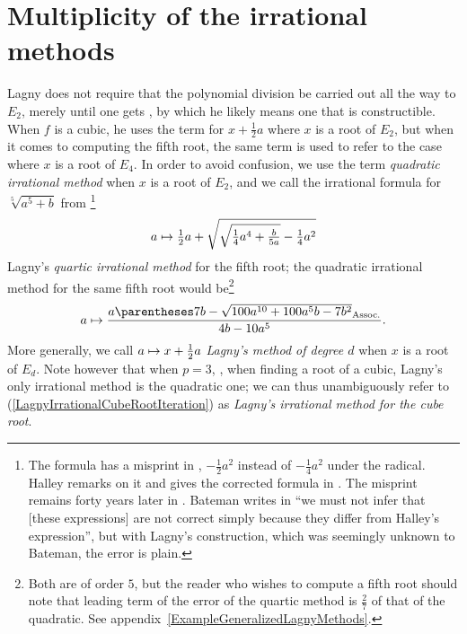 ﻿\documentclass[10pt, a4paper, twoside]{basestyle}
\begin{document}
\section*{Multiplicity of the irrational methods}
Lagny does not require that the polynomial division be carried out
all the way to $E_2$, merely until one gets , by which he likely means
one that is constructible. When $f$ is a cubic, he uses the term  for $x+\frac{1}{2}a$ where
$x$ is a root of $E_2$, but when it comes to computing the fifth root, the same term is used to refer to the case where $x$ is a root of
$E_4$. In order to avoid confusion, we use the term \emph{quadratic irrational method} when $x$ is a root of $E_2$,
and we call the irrational formula for $\sqrt[5]{a^5+b}$ from \cite[43]{FantetdeLagny1692}\footnote{The formula has a misprint in
\cite[43]{FantetdeLagny1692}, $-\tfrac{1}{2}a^2$ instead of $-\tfrac{1}{4}a^2$ under the radical.
Halley remarks on it and gives the corrected formula in \cite[137,140]{Halley1694}.
The misprint remains forty years later in \cite[\pno~440 misnumbered 340]{FantetdeLagny1733}.
Bateman writes in \cite{Bateman1938} ``we must not infer that [these expressions] are not correct simply because
they differ from Halley's expression'', but with Lagny's construction, which was seemingly unknown to Bateman, the
error is plain.}\[
\FunctionBody{a}{\tfrac{1}{2}a+\sqrt{\sqrt{\tfrac{1}{4}a^4+\tfrac{b}{5a}}-\tfrac{1}{4}a^2}}
\]
Lagny's \emph{quartic irrational method} for the fifth root;
the quadratic irrational method for the same fifth root would be\footnote{Both are of order $5$, but the reader who wishes
to compute a fifth root should note that leading term of the error of the quartic method is
$\frac{2}{7}$ of that of the quadratic. See appendix~\ref{ExampleGeneralizedLagnyMethods}.}\[
\FunctionBody{a}{\frac{a\pa{7b-\sqrt{100a^{10}+100a^{5}b-7b^2}}}{4b-10a^5}}\text.
\]
More generally, we call $\FunctionBody{a}{x+\frac{1}{2}a}$ \emph{Lagny's method of degree $d$} when
$x$ is a root of $E_{d}$.
Note however that when $p=3$, \idest, when finding a root of a cubic, Lagny's only irrational method
is the quadratic one; we can thus unambiguously refer to (\ref{LagnyIrrationalCubeRootIteration}) as \emph{Lagny's irrational method for the cube root}.
\end{document}
